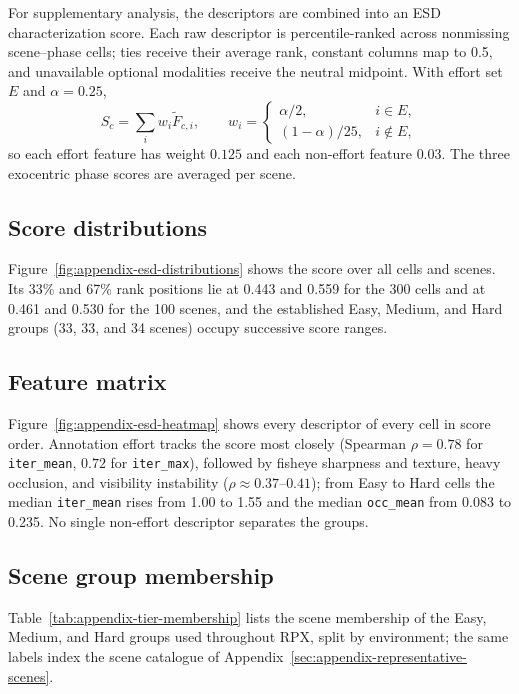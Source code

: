 For supplementary analysis, the descriptors are combined into an ESD characterization score. Each raw descriptor is percentile-ranked across nonmissing scene--phase cells; ties receive their average rank, constant columns map to 0.5, and unavailable optional modalities receive the neutral midpoint. With effort set $E$ and $\alpha=0.25$,
\begin{equation}
S_c=\sum_i w_i\widetilde F_{c,i},\qquad
w_i=\begin{cases}\alpha/2,&i\in E,\\(1-\alpha)/25,&i\notin E,\end{cases}
\label{eq:appendix-esd-score}
\end{equation}
so each effort feature has weight $0.125$ and each non-effort feature $0.03$. The three exocentric phase scores are averaged per scene.

\subsection{Score distributions}

Figure~\ref{fig:appendix-esd-distributions} shows the score over all cells and scenes. Its 33\% and 67\% rank positions lie at 0.443 and 0.559 for the 300 cells and at 0.461 and 0.530 for the 100 scenes, and the established Easy, Medium, and Hard groups (33, 33, and 34 scenes) occupy successive score ranges.

\subsection{Feature matrix}

Figure~\ref{fig:appendix-esd-heatmap} shows every descriptor of every cell in score order. Annotation effort tracks the score most closely (Spearman $\rho=0.78$ for \texttt{iter\_mean}, $0.72$ for \texttt{iter\_max}), followed by fisheye sharpness and texture, heavy occlusion, and visibility instability ($\rho\approx0.37$--$0.41$); from Easy to Hard cells the median \texttt{iter\_mean} rises from 1.00 to 1.55 and the median \texttt{occ\_mean} from 0.083 to 0.235. No single non-effort descriptor separates the groups.

\subsection{Scene group membership}

Table~\ref{tab:appendix-tier-membership} lists the scene membership of the Easy, Medium, and Hard groups used throughout RPX, split by environment; the same labels index the scene catalogue of Appendix~\ref{sec:appendix-representative-scenes}.

